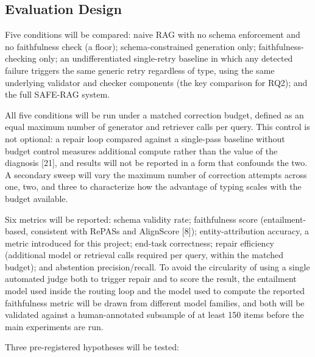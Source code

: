 \documentclass[11pt,a4paper]{article}
\begin{document}
\subsection{Evaluation Design}

Five conditions will be compared: naive RAG with no schema enforcement and no
faithfulness check (a floor); schema-constrained generation only; faithfulness-checking
only; an undifferentiated single-retry baseline in which any detected failure triggers
the same generic retry regardless of type, using the same underlying validator and
checker components (the key comparison for RQ2); and the full SAFE-RAG system.

All five conditions will be run under a matched correction budget, defined as an equal
maximum number of generator and retriever calls per query. This control is not optional:
a repair loop compared against a single-pass baseline without budget control measures
additional compute rather than the value of the diagnosis [21], and results will not be
reported in a form that confounds the two. A secondary sweep will vary the maximum number
of correction attempts across one, two, and three to characterize how the advantage of
typing scales with the budget available.

Six metrics will be reported: schema validity rate; faithfulness score (entailment-based,
consistent with RePASs and AlignScore [8]); entity-attribution accuracy, a metric
introduced for this project; end-task correctness; repair efficiency (additional model or
retrieval calls required per query, within the matched budget); and abstention
precision/recall. To avoid the circularity of using a single automated judge both to
trigger repair and to score the result, the entailment model used inside the routing loop
and the model used to compute the reported faithfulness metric will be drawn from
different model families, and both will be validated against a human-annotated subsample
of at least 150 items before the main experiments are run.

Three pre-registered hypotheses will be tested:
\end{document}
